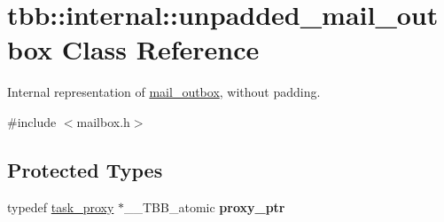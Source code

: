\hypertarget{classtbb_1_1internal_1_1unpadded__mail__outbox}{}\section{tbb\+:\+:internal\+:\+:unpadded\+\_\+mail\+\_\+outbox Class Reference}
\label{classtbb_1_1internal_1_1unpadded__mail__outbox}


Internal representation of \hyperlink{classtbb_1_1internal_1_1mail__outbox}{mail\+\_\+outbox}, without padding.  




{\ttfamily \#include $<$mailbox.\+h$>$}

\subsection*{Protected Types}
\begin{DoxyCompactItemize}
\item 
\hypertarget{classtbb_1_1internal_1_1unpadded__mail__outbox_a5400264b86ed06e7988ce05676502649}{}typedef \hyperlink{structtbb_1_1internal_1_1task__proxy}{task\+\_\+proxy} $\ast$\+\_\+\+\_\+\+T\+B\+B\+\_\+atomic {\bfseries proxy\+\_\+ptr}\label{classtbb_1_1internal_1_1unpadded__mail__outbox_a5400264b86ed06e7988ce05676502649}

\end{DoxyCompactItemize}
